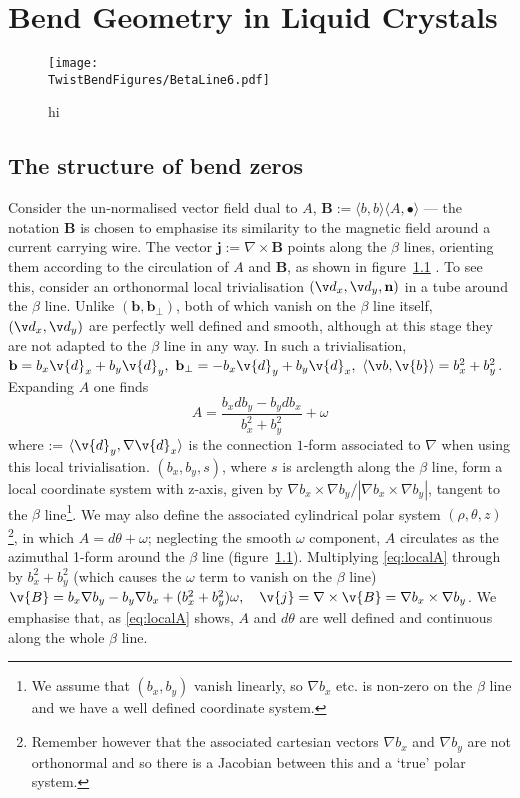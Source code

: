 \chapter{Bend Geometry in Liquid Crystals}
\label{ch:TwistBend}
\begin{figure}[htbp]
    \centering
    \texttt{[image: \\TwistBendFigures/BetaLine6.pdf]}
    \caption{hi}
    \label{fig:BetaLines}
\end{figure}
\section{The structure of bend zeros}

Consider the un-normalised vector field dual to $A$, $\mathbf{B} := \langle b,b \rangle \langle A, \bullet \rangle$ --- the notation $\mathbf{B}$ is chosen to emphasise its similarity to the magnetic field around a current carrying wire. The vector $\mathbf{j} := \nabla \times \mathbf{B}$ points along the $\beta$ lines, orienting them according to the circulation of $A$ and $\mathbf{B}$, as shown in figure~\ref{fig:BetaLines} \cite{MachonThesis}. To see this, consider an orthonormal local trivialisation $(\v d_x, \v d_y,\bf n)$ in a tube around the $\beta$ line. Unlike $(\mathbf{b}, \mathbf{b}_\perp)$, both of which vanish on the $\beta$ line itself, $(\v d_x, \v d_y)$ are perfectly well defined and smooth, although at this stage they are not adapted to the $\beta$ line in any way. In such a trivialisation, ${\bf b} = b_x \v{d}_x + b_y \v{d}_y,\ {\bf b}_\perp = -b_x \v{d}_y + b_y \v{d}_x,\ \langle \v b, \v{b} \rangle = b_x^2 + b_y^2$. Expanding $A$ one finds
\begin{equation}
    A = \frac{b_x d b_y - b_y d b_x}{b_x^2 + b_y^2}+ \omega
    \label{eq:localA}
\end{equation}
where \omega := $\langle \v{d}_y, \nabla \v{d}_x \rangle$ is the connection $1$-form associated to $\nabla$ when using this local trivialisation. $(b_x,b_y,s)$, where $s$ is arclength along the $\beta$ line, form a local coordinate system with z-axis, given by $\nabla b_x \times \nabla b_y/|\nabla b_x \times \nabla b_y|$, tangent to the $\beta$ line\footnote{We assume that $(b_x, b_y)$ vanish linearly, so $\nabla b_x$ etc. is non-zero on the $\beta$ line and we have a well defined coordinate system.}. We may also define the associated cylindrical polar system $(\rho,\theta,z)$\footnote{Remember however that the associated cartesian vectors $\nabla b_x$ and $\nabla b_y$ are not orthonormal and so there is a Jacobian between this and a `true' polar system.}, in which $A = d\theta + \omega$; neglecting the smooth $\omega$ component, $A$ circulates as the azimuthal 1-form around the $\beta$ line (figure~\ref{fig:BetaLines}). Multiplying \eqref{eq:localA} through by $b_x^2 + b_y^2$ (which causes the $\omega$ term to vanish on the $\beta$ line) $\v{B} = b_x \nabla b_y - b_y \nabla b_x + (b_x^2 + b_y^2) \omega , \quad \v{j} = \nabla \times \v{B} =\nabla b_x \times \nabla b_y$. We emphasise that, as \eqref{eq:localA} shows, $A$ and $d\theta$ are well defined and continuous along the whole $\beta$ line.

